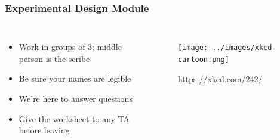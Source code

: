 \begin{noheadline}
\begin{frame}
    \frametitle{Experimental Design Module}

    \begin{columns}


        \vspace{-1cm}
        \begin{minipage}[c][\textheight][c]{\linewidth}
        \begin{itemize}
            \item Work in groups of 3; middle person is the scribe
            \item Be sure your names are legible
            \item We're here to answer questions
            \item Give the worksheet to any TA before leaving
        \end{itemize}
        \end{minipage}


        \vspace{-1cm}
        \begin{figure}
            \begin{center}
            \texttt{[image: ../images/xkcd-cartoon.png]}
            \caption{\tiny \href{https://xkcd.com/242/}{https://xkcd.com/242/}}
            \end{center}
        \end{figure}
    \end{columns}
\end{frame}
\end{noheadline}




